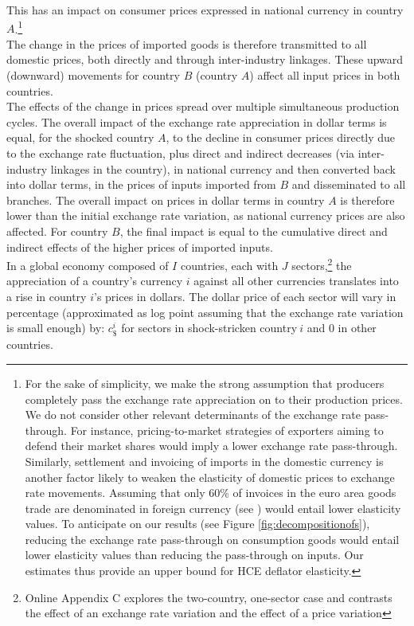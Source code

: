 \documentclass[11pt,a4paper]{paper} %
\begin{document}
This has an impact on consumer prices expressed in national currency in country $A$.\footnote{For the sake of simplicity, we make the strong assumption that producers completely pass the exchange rate appreciation on to their production prices.  We do not consider other relevant determinants of the exchange rate pass-through. For instance, pricing-to-market strategies of exporters aiming to defend their market shares would imply a lower exchange rate pass-through.
Similarly, settlement and invoicing of imports in the domestic currency is another factor likely to weaken the elasticity of domestic prices to exchange rate movements. Assuming that only 60\% of invoices in the euro area goods trade are denominated in foreign currency (see \cite{Ortega2020}) would entail lower elasticity values. To anticipate on our results (see Figure \ref{fig:decompositionofs}), reducing the exchange rate pass-through on consumption goods would entail lower elasticity values than reducing the pass-through on inputs. Our estimates thus provide an upper bound for HCE deflator elasticity.}\\
The change in the prices of imported goods is therefore transmitted to all domestic prices, both directly and through inter-industry linkages. 
These upward (downward) movements for country $B$ (country $A$) affect all input prices in both countries.\\
The effects of the change in prices spread over multiple simultaneous production cycles. 
The overall impact of the exchange rate appreciation in dollar terms is equal, for the shocked country $A$, to the decline in consumer prices directly due to the exchange rate fluctuation, plus direct and indirect decreases (via inter-industry linkages in the country), in national currency and then converted back into dollar terms, in the prices of inputs imported from $B$ and disseminated to all branches. 
The overall impact on prices in dollar terms in country $A$ is therefore lower than the initial exchange rate variation, as national currency prices are also affected. 
For country $B$, the final impact is equal to the cumulative direct and indirect effects of the higher prices of imported inputs.\\
In a global economy composed of $I$ countries, each with $J$ sectors,\footnote{Online Appendix C explores the two-country, one-sector case and contrasts the effect of an exchange rate variation and the effect of a price variation} the appreciation of a country's currency $i$ against all other currencies translates into a rise in country $i$'s prices in dollars. The dollar price of each sector will vary in percentage (approximated as log point assuming that the exchange rate variation is small enough) by: $c_\$^i$ for sectors in shock-stricken country$~i$ and 0 in other countries. \\
\end{document}
